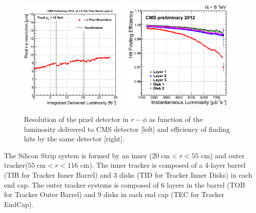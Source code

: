 \begin{figure}[!Hhtbp]
  \begin{center}
    \includegraphics[width=0.48\textwidth]{figs/PXB2_residuals.png}
    \includegraphics[width=0.48\textwidth]{figs/HitEff_vs_InstLumi.png}
    \caption{Resolution of the pixel detector in $r-\phi$ as function of the luminosity delivered to CMS detector [left] and efficiency of finding hits by the same detector [right].}
    \label{fig:pixelresolution}
  \end{center}
\end{figure}

The Silicon Strip system is formed by an inner ($20\;\text{cm} < r < 55$ cm) and outer tracker($55\;\text{cm} < r < 116$ cm). The inner tracker is composed of a 4-layer barrel (TIB for Tracker Inner Barrel) and 3 disks (TID for Tracker Inner Disks) in each end cap. The outer tracker systems is composed of 6 layers in the barrel (TOB for Tracker Outer Barrel) and 9 disks in each end cap (TEC for Tracker EndCap).


